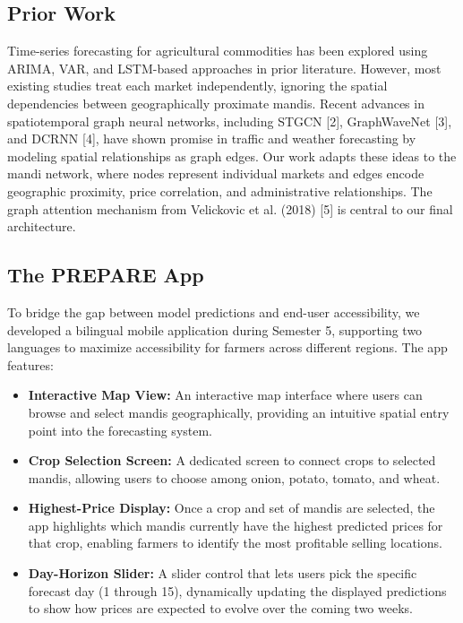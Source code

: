 \documentclass[conference]{IEEEtran}
\begin{document}
\subsection{Prior Work}

Time-series forecasting for agricultural commodities has been explored using ARIMA, VAR, and LSTM-based approaches in prior literature. However, most existing studies treat each market independently, ignoring the spatial dependencies between geographically proximate mandis. Recent advances in spatiotemporal graph neural networks, including STGCN [2], GraphWaveNet [3], and DCRNN [4], have shown promise in traffic and weather forecasting by modeling spatial relationships as graph edges. Our work adapts these ideas to the mandi network, where nodes represent individual markets and edges encode geographic proximity, price correlation, and administrative relationships. The graph attention mechanism from Velickovic et al. (2018) [5] is central to our final architecture.

\subsection{The PREPARE App}

To bridge the gap between model predictions and end-user accessibility, we developed a bilingual mobile application during Semester 5, supporting two languages to maximize accessibility for farmers across different regions. The app features:

\begin{itemize}
\item \textbf{Interactive Map View:} An interactive map interface where users can browse and select mandis geographically, providing an intuitive spatial entry point into the forecasting system.
\item \textbf{Crop Selection Screen:} A dedicated screen to connect crops to selected mandis, allowing users to choose among onion, potato, tomato, and wheat.
\item \textbf{Highest-Price Display:} Once a crop and set of mandis are selected, the app highlights which mandis currently have the highest predicted prices for that crop, enabling farmers to identify the most profitable selling locations.
\item \textbf{Day-Horizon Slider:} A slider control that lets users pick the specific forecast day (1 through 15), dynamically updating the displayed predictions to show how prices are expected to evolve over the coming two weeks.
\end{itemize}
\end{document}
